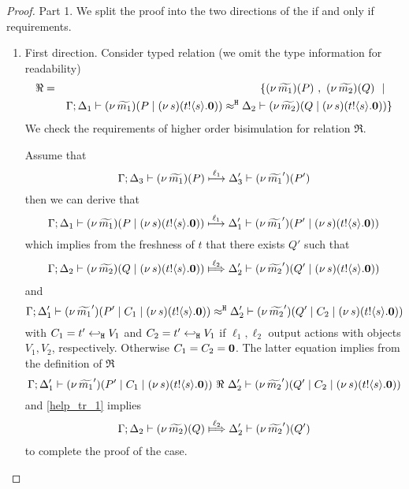 \begin{proof}
	Part 1. We split the proof into the two directions
	of the if and only if requirements.
	\begin{enumerate}
		\item	First direction. Consider typed relation (we omit the type information for readability)
				\begin{eqnarray*}
					\Re &=& \set{	\newsp{\widetilde{m_1}}{P}\ , \ 
									\newsp{\widetilde{m_2}}{Q} \setbar\\
					&&
									\horel{\Gamma}{\Delta_1}{\newsp{\widetilde{m_1}}{P \Par \newsp{s}{\bout{t}{s} \inact}  } }
									{\hwb}
									{\Delta_2}{\newsp{\widetilde{m_2}}{Q \Par \newsp{s}{\bout{t}{s} \inact}  } }
					}
				\end{eqnarray*}
				We check the requirements of higher order bisimulation
				for relation $\Re$.

				Assume that
				\[
					\Gamma; \Delta_3 \vdash (\nu\, \widetilde{m_1})(P   )  \stackrel{\ell_1}{\longmapsto} \Delta_3' \vdash (\nu\, \widetilde{m_1}')(P')
				\]
				then we can derive that
				\[
					\Gamma; \Delta_1 \vdash (\nu\, \widetilde{m_1})(P \;|\; (\nu\, s)(t ! \langle s \rangle . \mathbf{0})  )  \stackrel{\ell_1}{\longmapsto} \Delta_1' \vdash (\nu\, \widetilde{m_1}')(P' \;|\; (\nu\, s)(t ! \langle s \rangle . \mathbf{0})  )
				\]
				which implies from the freshness of $t$ that there exists $Q'$ such that
				\begin{eqnarray}
					\horel{\Gamma}{\Delta_2}{\newsp{\widetilde{m_2}}{Q \Par \newsp{s}{\bout{t}{s} \inact}  } }
					{\Hby{\ell_2}}
					{\Delta_2'}{\newsp{\widetilde{m_2}'}{Q' \Par \newsp{s}{\bout{t}{s} \inact}  } }
					\label{help_tr_1}
				\end{eqnarray}
				and
				\[
					\Gamma; \Delta_1' \vdash (\nu\, \widetilde{m_1}')(P' \;|\; C_1 \;|\; (\nu\, s)(t ! \langle s \rangle . \mathbf{0})  )  \approx^\mathtt{H} \Delta_2' \vdash (\nu\, \widetilde{m_2}')(Q' \;|\; C_2 \;|\; (\nu\, s)(t ! \langle s \rangle . \mathbf{0})  )
				\]
				with $C_1 = t' \hookleftarrow_{\mathtt{H}} V_1$ and $C_2 = t' \hookleftarrow_{\mathtt{H}} V_1$ if $\ell_1, \ell_2$ output actions
				with objects $V_1, V_2$, respectively. Otherwise $C_1 = C_2 = \mathbf{0}$.
				The latter equation implies from the definition of $\Re$
				\[
					\Gamma; \Delta_1' \vdash (\nu\, \widetilde{m_1}')(P' \;|\; C_1 \;|\; (\nu\, s)(t ! \langle s \rangle . \mathbf{0})  )  \ \Re\  \Delta_2' \vdash (\nu\, \widetilde{m_2}')(Q' \;|\; C_2 \;|\; (\nu\, s)(t ! \langle s \rangle . \mathbf{0})  )
				\]
				and \eqref{help_tr_1} implies
				\begin{eqnarray*}
					\horel{\Gamma}{\Delta_2}{\newsp{\widetilde{m_2}}{Q } }
					{\Hby{\ell_2}}
					{\Delta_2'}{\newsp{\widetilde{m_2}'}{Q'} }
				\end{eqnarray*}
				to complete the proof of the case.


\end{enumerate}
\end{proof}

